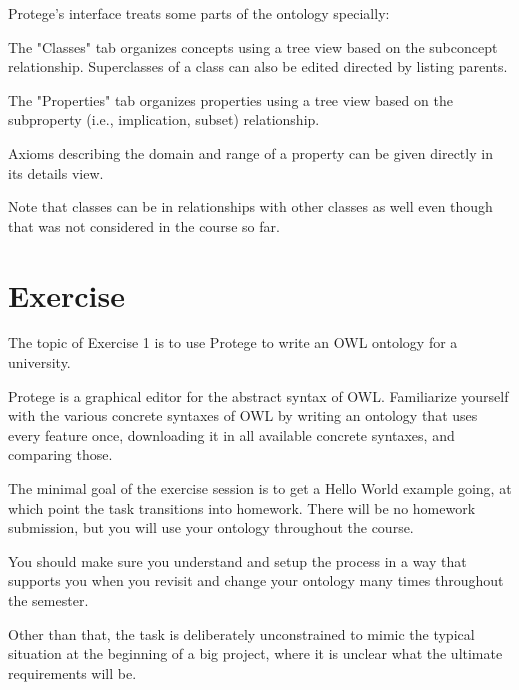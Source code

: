 Protege's interface treats some parts of the ontology specially:
\begin{compactitem}
 \item The "Classes" tab organizes concepts using a tree view based on the subconcept relationship.
 Superclasses of a class can also be edited directed by listing parents.
 \item The "Properties" tab organizes properties using a tree view based on the subproperty (i.e., implication, subset) relationship.
 \item Axioms describing the domain and range of a property can be given directly in its details view.
\end{compactitem}

Note that classes can be in relationships with other classes as well even though that was not considered in the course so far.

\section{Exercise}

The topic of Exercise 1 is to use Protege to write an OWL ontology for a university.

Protege is a graphical editor for the abstract syntax of OWL.
Familiarize yourself with the various concrete syntaxes of OWL by writing an ontology that uses every feature once, downloading it in all available concrete syntaxes, and comparing those.

The minimal goal of the exercise session is to get a Hello World example going, at which point the task transitions into homework.
There will be no homework submission, but you will use your ontology throughout the course.

You should make sure you understand and setup the process in a way that supports you when you revisit and change your ontology many times throughout the semester.

Other than that, the task is deliberately unconstrained to mimic the typical situation at the beginning of a big project, where it is unclear what the ultimate requirements will be.